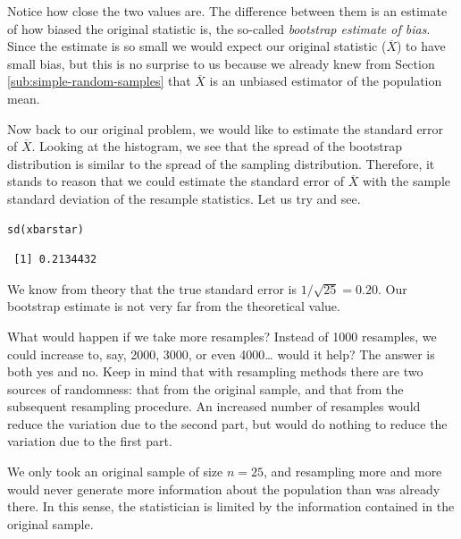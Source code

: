 \documentclass[captions=tableheading]{scrbook}
\begin{document}
Notice how close the two values are. The difference between them is an estimate of how biased the original statistic is, the so-called \emph{bootstrap estimate of bias}. Since the estimate is so small we would expect our original statistic (\(\overline{X}\)) to have small bias, but this is no surprise to us because we already knew from Section \ref{sub:simple-random-samples} that \(\overline{X}\) is an unbiased estimator of the population mean.

Now back to our original problem, we would like to estimate the standard error of \(\overline{X}\). Looking at the histogram, we see that the spread of the bootstrap distribution is similar to the spread of the sampling distribution. Therefore, it stands to reason that we could estimate the standard error of \(\overline{X}\) with the sample standard deviation of the resample statistics. Let us try and see.


\begin{verbatim}
sd(xbarstar)
\end{verbatim}

\begin{verbatim}
 [1] 0.2134432
\end{verbatim}

We know from theory that the true standard error is \(1/\sqrt{25}=0.20\). Our bootstrap estimate is not very far from the theoretical value. 

\begin{rem}
What would happen if we take more resamples? Instead of 1000 resamples, we could increase to, say, 2000, 3000, or even 4000\ldots{} would it help? The answer is both yes and no. Keep in mind that with resampling methods there are two sources of randomness: that from the original sample, and that from the subsequent resampling procedure. An increased number of resamples would reduce the variation due to the second part, but would do nothing to reduce the variation due to the first part.

We only took an original sample of size \(n=25\), and resampling more and more would never generate more information about the population than was already there. In this sense, the statistician is limited by the information contained in the original sample. 
\end{rem}
\end{document}
